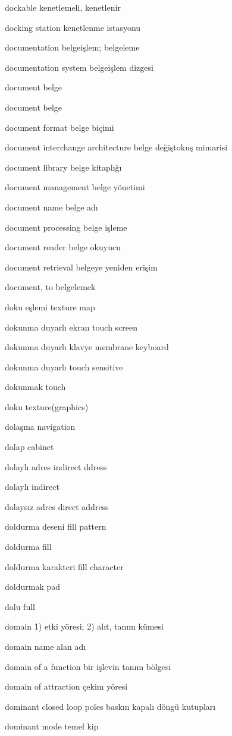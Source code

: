 \documentclass[12pt,fleqn]{article}\usepackage{../../common}
\begin{document}
dockable kenetlemeli, kenetlenir

docking station kenetlenme istasyonu

documentation belgeişlem; belgeleme

documentation system belgeişlem dizgesi

document belge

document belge

document format belge biçimi

document interchange architecture belge değiştokuş mimarisi

document library belge kitaplığı

document management belge yönetimi

document name belge adı

document processing belge işleme

document reader belge okuyucu

document retrieval belgeye yeniden erişim

document, to belgelemek

doku eşlemi texture map

dokunma duyarlı ekran touch screen

dokunma duyarlı klavye membrane keyboard

dokunma duyarlı touch sensitive

dokunmak touch

doku texture(graphics)

dolaşma navigation

dolap cabinet

dolaylı adres indirect ddress

dolaylı indirect

dolaysız adres direct address

doldurma deseni fill pattern

doldurma fill

doldurma karakteri fill character

doldurmak pad

dolu full

domain 1) etki yöresi; 2) alıt, tanım kümesi

domain name alan adı

domain of a function bir işlevin tanım bölgesi

domain of attraction çekim yöresi

dominant closed loop poles baskın kapalı döngü kutupları

dominant mode temel kip
\end{document}
